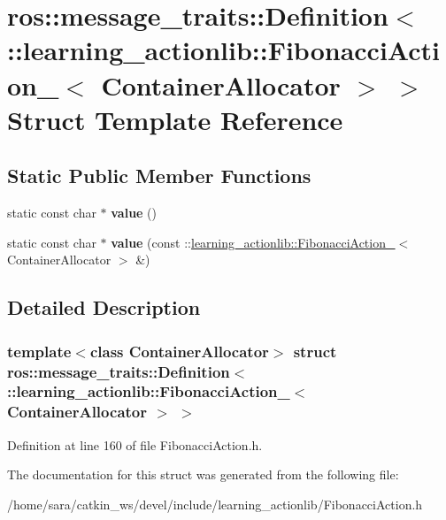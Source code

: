 \hypertarget{structros_1_1message__traits_1_1Definition_3_01_1_1learning__actionlib_1_1FibonacciAction___3_01ContainerAllocator_01_4_01_4}{}\section{ros\+:\+:message\+\_\+traits\+:\+:Definition$<$ \+:\+:learning\+\_\+actionlib\+:\+:Fibonacci\+Action\+\_\+$<$ Container\+Allocator $>$ $>$ Struct Template Reference}
\label{structros_1_1message__traits_1_1Definition_3_01_1_1learning__actionlib_1_1FibonacciAction___3_01ContainerAllocator_01_4_01_4}
\subsection*{Static Public Member Functions}
\begin{DoxyCompactItemize}
\item 
\mbox{\label{structros_1_1message__traits_1_1Definition_3_01_1_1learning__actionlib_1_1FibonacciAction___3_01ContainerAllocator_01_4_01_4_a7cf06ca6bcbc38b85725fdf26dd1a02b}} 
static const char $\ast$ {\bfseries value} ()
\item 
\mbox{\label{structros_1_1message__traits_1_1Definition_3_01_1_1learning__actionlib_1_1FibonacciAction___3_01ContainerAllocator_01_4_01_4_acd46ae5de258d79f278fc1fbfb98f07b}} 
static const char $\ast$ {\bfseries value} (const \+::\hyperlink{structlearning__actionlib_1_1FibonacciAction__}{learning\+\_\+actionlib\+::\+Fibonacci\+Action\+\_\+}$<$ Container\+Allocator $>$ \&)
\end{DoxyCompactItemize}


\subsection{Detailed Description}
\subsubsection*{template$<$class Container\+Allocator$>$\newline
struct ros\+::message\+\_\+traits\+::\+Definition$<$ \+::learning\+\_\+actionlib\+::\+Fibonacci\+Action\+\_\+$<$ Container\+Allocator $>$ $>$}



Definition at line 160 of file Fibonacci\+Action.\+h.



The documentation for this struct was generated from the following file\+:\begin{DoxyCompactItemize}
\item 
/home/sara/catkin\+\_\+ws/devel/include/learning\+\_\+actionlib/Fibonacci\+Action.\+h\end{DoxyCompactItemize}
